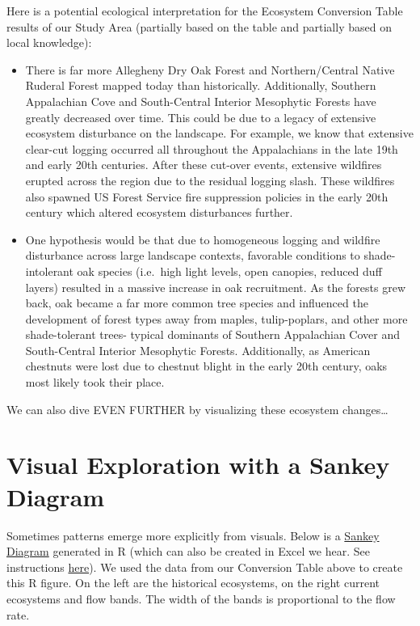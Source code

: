 \documentclass[
]{book}
\providecommand{\tightlist}{%
  \setlength{\itemsep}{0pt}\setlength{\parskip}{0pt}}
\begin{document}
Here is a potential ecological interpretation for the Ecosystem Conversion Table results of our Study Area (partially based on the table and partially based on local knowledge):

\begin{itemize}
\tightlist
\item
  There is far more Allegheny Dry Oak Forest and Northern/Central Native Ruderal Forest mapped today than historically. Additionally, Southern Appalachian Cove and South-Central Interior Mesophytic Forests have greatly decreased over time. This could be due to a legacy of extensive ecosystem disturbance on the landscape. For example, we know that extensive clear-cut logging occurred all throughout the Appalachians in the late 19th and early 20th centuries. After these cut-over events, extensive wildfires erupted across the region due to the residual logging slash. These wildfires also spawned US Forest Service fire suppression policies in the early 20th century which altered ecosystem disturbances further.
\item
  One hypothesis would be that due to homogeneous logging and wildfire disturbance across large landscape contexts, favorable conditions to shade-intolerant oak species (i.e.~high light levels, open canopies, reduced duff layers) resulted in a massive increase in oak recruitment. As the forests grew back, oak became a far more common tree species and influenced the development of forest types away from maples, tulip-poplars, and other more shade-tolerant trees- typical dominants of Southern Appalachian Cover and South-Central Interior Mesophytic Forests. Additionally, as American chestnuts were lost due to chestnut blight in the early 20th century, oaks most likely took their place.
\end{itemize}

We can also dive EVEN FURTHER by visualizing these ecosystem changes\ldots{}

\hypertarget{visual-exploration-with-a-sankey-diagram}{%
\section{Visual Exploration with a Sankey Diagram}\label{visual-exploration-with-a-sankey-diagram}}

Sometimes patterns emerge more explicitly from visuals. Below is a \href{https://en.wikipedia.org/wiki/Sankey_diagram}{Sankey Diagram} generated in R (which can also be created in Excel we hear. See instructions \href{https://mychartguide.com/how-to-draw-sankey-diagram-in-excel/}{here}). We used the data from our Conversion Table above to create this R figure. On the left are the historical ecosystems, on the right current ecosystems and flow bands. The width of the bands is proportional to the flow rate.
\end{document}
